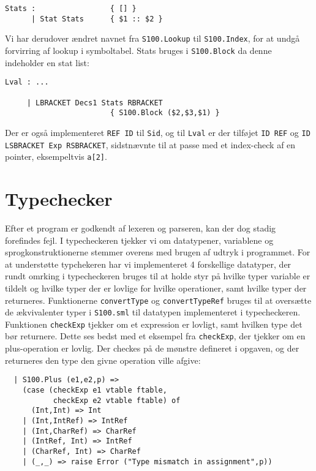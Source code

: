 \documentclass[12pt]{article}
\begin{document}
\begin{verbatim}
Stats :                 { [] }
      | Stat Stats      { $1 :: $2 }
\end{verbatim}

Vi har derudover ændret navnet fra \texttt{S100.Lookup} til \texttt{S100.Index}, for at undgå forvirring af lookup i symboltabel. Stats bruges i \texttt{S100.Block} da denne indeholder en stat list:\\

\begin{verbatim}
Lval : ...

     | LBRACKET Decs1 Stats RBRACKET
                        { S100.Block ($2,$3,$1) }
\end{verbatim}

Der er også implementeret \texttt{REF ID} til \texttt{Sid}, og til \texttt{Lval} er der tilføjet \texttt{ID REF} og \texttt{ID LSBRACKET Exp RSBRACKET}, sidstnævnte til at passe med et index-check af en pointer, eksempeltvis \texttt{a[2]}.

\section{Typechecker}
Efter et program er godkendt af lexeren og parseren, kan der dog stadig forefindes fejl. I typecheckeren tjekker vi om datatypener, variablene og sprogkonstruktionerne stemmer overens med brugen af udtryk i programmet. For at understøtte typchekeren har vi implementeret 4 forskellige datatyper, der rundt omrking i typecheckeren bruges til at holde styr på hvilke typer variable er tildelt og hvilke typer der er lovlige for hvilke operationer, samt hvilke typer der returneres. Funktionerne \texttt{convertType} og \texttt{convertTypeRef} bruges til at oversætte de ækvivalenter typer i \texttt{S100.sml} til datatypen implementeret i typecheckeren. \\
Funktionen \texttt{checkExp} tjekker om et expression er lovligt, samt hvilken type det bør returnere. Dette ses bedst med et eksempel fra \texttt{checkExp}, der tjekker om en plus-operation er lovlig. Der checkes på de mønstre defineret i opgaven, og der returneres den type den givne operation ville afgive:\\

\begin{verbatim}
  | S100.Plus (e1,e2,p) =>
    (case (checkExp e1 vtable ftable,
           checkExp e2 vtable ftable) of
      (Int,Int) => Int
    | (Int,IntRef) => IntRef
    | (Int,CharRef) => CharRef
    | (IntRef, Int) => IntRef
    | (CharRef, Int) => CharRef
    | (_,_) => raise Error ("Type mismatch in assignment",p))
\end{verbatim}
\end{document}
